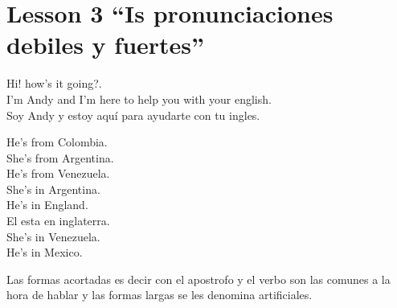 \section{Lesson 3 ``Is pronunciaciones debiles y fuertes''}

Hi! how's it going?.\\
I'm Andy and I'm here to help you with your english.\\
Soy Andy y estoy aquí para ayudarte con tu ingles.

He's from Colombia.\\
She's from Argentina.\\
He's from Venezuela.\\
She's in Argentina.\\
He's in England.\\
El esta en inglaterra.\\
She's in Venezuela.\\
He's in Mexico.

Las formas acortadas es decir con el apostrofo y el verbo son las
comunes a la hora de hablar y las formas largas se les denomina
artificiales.


